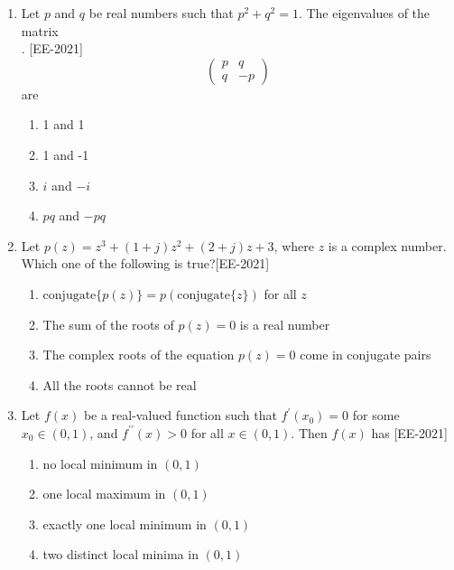 \documentclass[journal]{IEEEtran}
\begin{document}
\begin{enumerate}
Based on the above statements, the only INCORRECT option given below is: \\. \hfill{[EE-2021]}
    \begin{enumerate}
        \item  There are two cars parked in between $Q$ and $V$.
        \item  $Q$ and $R$ are not parked together.
        \item  $V$ is the only car parked in between $S$ and $R$.
        \item  Car $P$ is parked at the extreme end.
    \end{enumerate}
\item Let $p$ and $q$ be real numbers such that $p^2 + q^2 = 1$. The eigenvalues of the matrix\\.  \hfill{[EE-2021]}
\[
\begin{pmatrix}
p & q \\
q & -p
\end{pmatrix}
\]
are
    \begin{enumerate}
        \item  1 and 1
        \item  1 and -1
        \item  $i$ and $-i$
        \item  $pq$ and $-pq$
    \end{enumerate}

\item Let $p(z) = z^3 + (1 + j)z^2 + (2 + j)z + 3$, where $z$ is a complex number. Which one of the following is true?\hfill{[EE-2021]}
    \begin{enumerate}
        \item  $\text{conjugate}\{p(z)\} = p(\text{conjugate}\{z\})$ for all $z$
        \item  The sum of the roots of $p(z) = 0$ is a real number
        \item  The complex roots of the equation $p(z) = 0$ come in conjugate pairs
        \item  All the roots cannot be real
    \end{enumerate}

\item Let $f(x)$ be a real-valued function such that $f^\prime(x_0) = 0$ for some $x_0 \in (0, 1)$, and $f^{\prime\prime}(x) > 0$ for all $x \in (0, 1)$. Then $f(x)$ has \hfill{[EE-2021]}
    \begin{enumerate}
        \item  no local minimum in $(0, 1)$
        \item  one local maximum in $(0, 1)$
        \item  exactly one local minimum in $(0, 1)$
        \item  two distinct local minima in $(0, 1)$
    \end{enumerate}
    

\end{enumerate}
\end{document}
